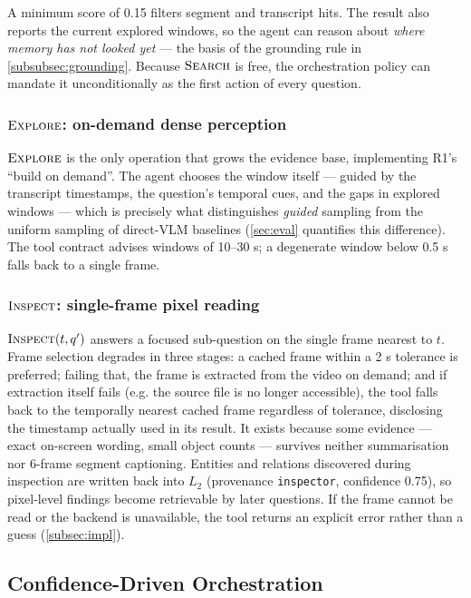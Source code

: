 A minimum score of 0.15 filters segment and transcript hits. The result also reports the current
explored windows, so the agent can reason about \emph{where memory has not looked yet} --- the basis of
the grounding rule in \cref{subsubsec:grounding}. Because $\textsc{Search}$ is free, the orchestration policy can
mandate it unconditionally as the first action of every question.

\subsubsection{$\textsc{Explore}$: on-demand dense perception}
\label{subsubsec:explore}

$\textsc{Explore}$ is the only operation that grows the evidence base, implementing R1's ``build
on demand''. The agent chooses the window itself --- guided by the transcript timestamps, the
question's temporal cues, and the gaps in explored windows --- which is precisely what
distinguishes \emph{guided} sampling from the uniform sampling of direct-VLM baselines (\cref{sec:eval} quantifies
this difference). The tool contract advises windows of 10--30 s; a degenerate window below 0.5 s
falls back to a single frame.

\subsubsection{$\textsc{Inspect}$: single-frame pixel reading}
\label{subsubsec:inspect}

$\textsc{Inspect}(t, q')$ answers a focused sub-question on the single frame nearest to $t$.
Frame selection degrades in three stages: a cached frame within a 2 s tolerance is preferred;
failing that, the frame is extracted from the video on demand; and if extraction itself fails
(e.g. the source file is no longer accessible), the tool falls back to the temporally nearest
cached frame regardless of tolerance, disclosing the timestamp actually used in its result.
It exists because
some evidence --- exact on-screen wording, small object counts --- survives neither summarisation nor
6-frame segment captioning. Entities and relations discovered during inspection are written back
into $L_2$ (provenance \texttt{inspector}, confidence 0.75), so pixel-level findings become retrievable
by later questions. If the frame cannot be read or the backend is unavailable, the tool returns
an explicit error rather than a guess (\cref{subsec:impl}).

\subsection{Confidence-Driven Orchestration}
\label{subsec:orchestration}

